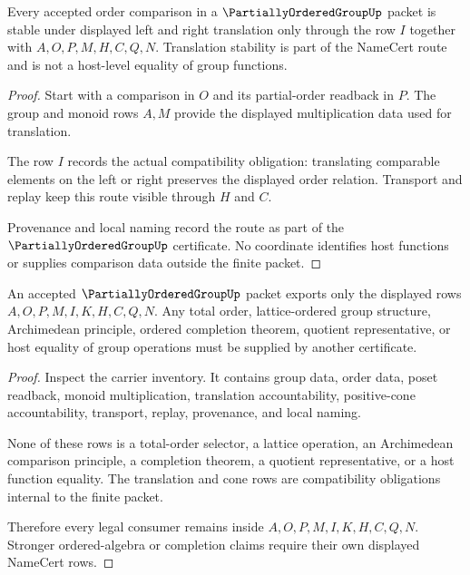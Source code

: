 \begin{theorem}
\label{thm:partially-ordered-group-order-translation}
Every accepted order comparison in a $\PartiallyOrderedGroupUp$ packet is stable under displayed left and right translation only through the row $I$ together with $A,O,P,M,H,C,Q,N$. Translation stability is part of the NameCert route and is not a host-level equality of group functions.
\end{theorem}
\begin{proof}
Start with a comparison in $O$ and its partial-order readback in $P$. The group and monoid rows $A,M$ provide the displayed multiplication data used for translation.

The row $I$ records the actual compatibility obligation: translating comparable elements on the left or right preserves the displayed order relation. Transport and replay keep this route visible through $H$ and $C$.

Provenance and local naming record the route as part of the $\PartiallyOrderedGroupUp$ certificate. No coordinate identifies host functions or supplies comparison data outside the finite packet.
\end{proof}

\begin{theorem}
\label{thm:partially-ordered-group-nonescape}
An accepted $\PartiallyOrderedGroupUp$ packet exports only the displayed rows $A,O,P,M,I,K,H,C,Q,N$. Any total order, lattice-ordered group structure, Archimedean principle, ordered completion theorem, quotient representative, or host equality of group operations must be supplied by another certificate.
\end{theorem}
\begin{proof}
Inspect the carrier inventory. It contains group data, order data, poset readback, monoid multiplication, translation accountability, positive-cone accountability, transport, replay, provenance, and local naming.

None of these rows is a total-order selector, a lattice operation, an Archimedean comparison principle, a completion theorem, a quotient representative, or a host function equality. The translation and cone rows are compatibility obligations internal to the finite packet.

Therefore every legal consumer remains inside $A,O,P,M,I,K,H,C,Q,N$. Stronger ordered-algebra or completion claims require their own displayed NameCert rows.
\end{proof}

